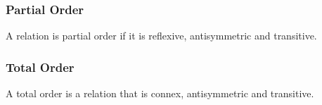 \documentclass[a4paper]{article}
\theoremstyle{plain}
\theoremstyle{definition}
\newtheorem{defn}{Definition}[section]
\theoremstyle{remark}
\begin{document}
\subsubsection{Partial Order}
\begin{tcolorbox}[colback=black!3!white,colframe=black!60!white,title=\begin{defn}Partial Order \label{Partial Order}\end{defn}]
A relation is partial order if it is reflexive, antisymmetric and transitive.
\end{tcolorbox}
\subsubsection{Total Order}
\begin{tcolorbox}[colback=black!3!white,colframe=black!60!white,title=\begin{defn}Total Order \label{Total Order}\end{defn}]
A total order is a relation that is connex, antisymmetric and transitive.
\end{tcolorbox}
\end{document}
